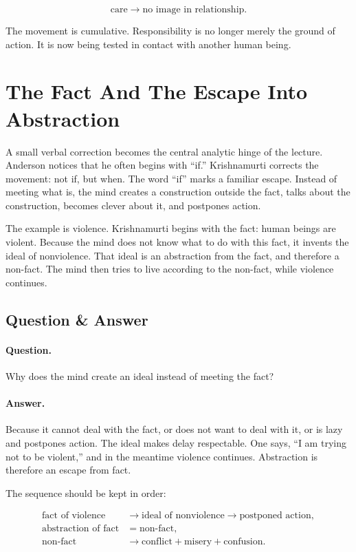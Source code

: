 \begin{equation}
\text{care}
\longrightarrow
\text{no image in relationship}.
\end{equation}

The movement is cumulative. Responsibility is no longer merely the ground of action. It is now being tested in contact with another human being.

\section{The Fact And The Escape Into Abstraction}

A small verbal correction becomes the central analytic hinge of the lecture. Anderson notices that he often begins with ``if.'' Krishnamurti corrects the movement: not if, but when. The word ``if'' marks a familiar escape. Instead of meeting what is, the mind creates a construction outside the fact, talks about the construction, becomes clever about it, and postpones action.

The example is violence. Krishnamurti begins with the fact: human beings are violent. Because the mind does not know what to do with this fact, it invents the ideal of nonviolence. That ideal is an abstraction from the fact, and therefore a non-fact. The mind then tries to live according to the non-fact, while violence continues.

\subsection{Question \& Answer}

\paragraph{Question.}
Why does the mind create an ideal instead of meeting the fact?

\paragraph{Answer.}
Because it cannot deal with the fact, or does not want to deal with it, or is lazy and postpones action. The ideal makes delay respectable. One says, ``I am trying not to be violent,'' and in the meantime violence continues. Abstraction is therefore an escape from fact.

The sequence should be kept in order:

\begin{align}
\text{fact of violence}
&\longrightarrow \text{ideal of nonviolence}
\longrightarrow \text{postponed action}, \\
\text{abstraction of fact}
&= \text{non-fact}, \\
\text{non-fact}
&\longrightarrow \text{conflict}+\text{misery}+\text{confusion}.
\end{align}

